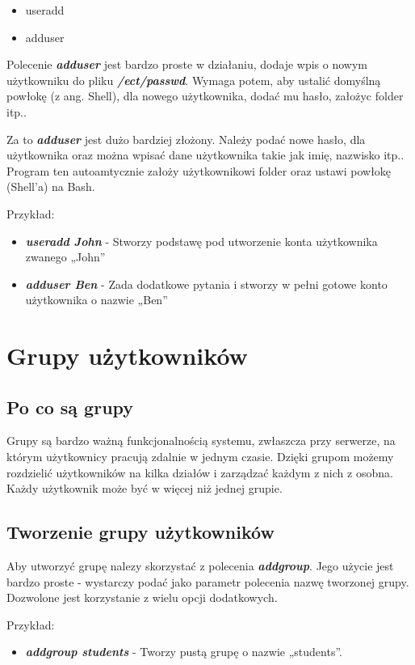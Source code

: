\documentclass{article}
\begin{document}
\begin{itemize}
    \item useradd
    \item adduser
\end{itemize}

Polecenie \emph{\textbf{adduser}} jest bardzo proste w działaniu, dodaje wpis o nowym użytkowniku do pliku \emph{\textbf{/ect/passwd}}. Wymaga potem, aby ustalić domyślną powłokę (z ang. Shell), dla nowego użytkownika, dodać mu hasło, założyc folder itp..\par

Za to \emph{\textbf{adduser}} jest dużo bardziej złożony. Należy podać nowe hasło, dla użytkownika oraz można wpisać dane użytkownika takie jak imię, nazwisko itp.. Program ten autoamtycznie założy użytkownikowi folder oraz ustawi powłokę (Shell'a) na Bash.\par 

Przykład:
\begin{itemize}
    \item \emph{\textbf{useradd John}} - Stworzy podstawę pod utworzenie konta użytkownika zwanego
    „John”
    \item \emph{\textbf{adduser Ben}} - Zada dodatkowe pytania i stworzy w pełni gotowe konto użytkownika o nazwie „Ben”
\end{itemize}





\section{Grupy użytkowników}


\subsection{Po co są grupy}
Grupy są bardzo ważną funkcjonalnością systemu, zwłaszcza przy serwerze, na którym użytkownicy pracują zdalnie w jednym czasie. Dzięki grupom możemy rozdzielić
użytkowników na kilka działów i zarządzać każdym z nich z osobna. Każdy użytkownik
może być w więcej niż jednej grupie. \par



\subsection{Tworzenie grupy użytkowników}

Aby utworzyć grupę nalezy skorzystać z polecenia \emph{\textbf{addgroup}}. Jego użycie jest bardzo
proste - wystarczy podać jako parametr polecenia nazwę tworzonej grupy. Dozwolone
jest korzystanie z wielu opcji dodatkowych.\par
Przykład:
\begin{itemize}
    \item \emph{\textbf{addgroup students}} - Tworzy pustą grupę o nazwie „students”.
\end{itemize}
\end{document}

